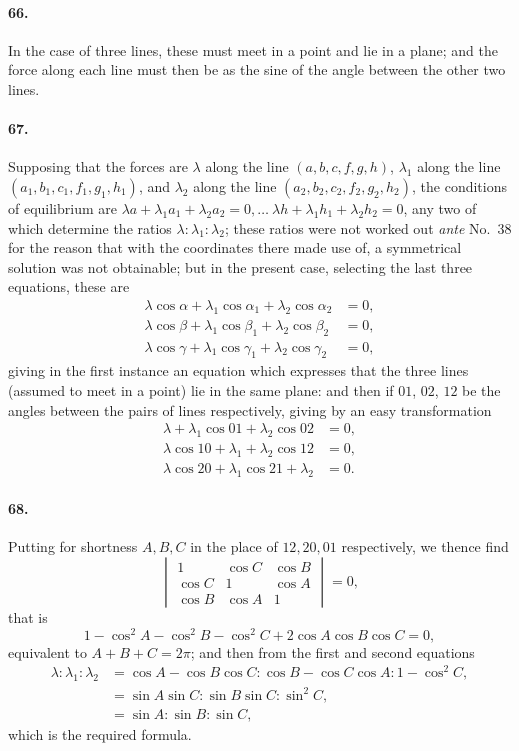 \documentclass[11pt,a4paper]{article}
\begin{document}
\paragraph{66.}
In the case of three lines, these must meet in a point and lie in a plane;
and the force along each line must then be as the sine of the angle between the
other two lines.

\paragraph{67.}
Supposing that the forces are $\lambda$ along the line $(a,b,c,f,g,h)$, $\lambda_1$
along the line $(a_1, b_1, c_1, f_1, g_1, h_1)$, and $\lambda_2$ along the line
$(a_2, b_2, c_2, f_2, g_2, h_2)$, the conditions of equilibrium are
$\lambda a + \lambda_1 a_1 + \lambda_2 a_2 = 0, \ldots\ \lambda h + \lambda_1 h_1 + \lambda_2 h_2 = 0$, any two of
which determine the ratios $\lambda : \lambda_1 : \lambda_2$; these ratios were not worked out
\textit{ante} No.\ 38 for the reason that with the coordinates there made use of, a
symmetrical solution was not obtainable; but in the present case, selecting the last
three equations, these are
\begin{align*}
\lambda \cos\alpha + \lambda_1 \cos\alpha_1 + \lambda_2 \cos\alpha_2 &= 0, \\
\lambda \cos\beta + \lambda_1 \cos\beta_1 + \lambda_2 \cos\beta_2 &= 0, \\
\lambda \cos\gamma + \lambda_1 \cos\gamma_1 + \lambda_2 \cos\gamma_2 &= 0,
\end{align*}
giving in the first instance an equation which expresses that the three lines (assumed
to meet in a point) lie in the same plane: and then if $01$, $02$, $12$ be the angles
between the pairs of lines respectively, giving by an easy transformation
\begin{align*}
\lambda + \lambda_1 \cos 01 + \lambda_2 \cos 02 &= 0, \\
\lambda \cos 10 + \lambda_1 + \lambda_2 \cos 12 &= 0, \\
\lambda \cos 20 + \lambda_1 \cos 21 + \lambda_2 &= 0.
\end{align*}

\paragraph{68.}
Putting for shortness $A, B, C$ in the place of $12, 20, 01$ respectively, we
thence find
\[
\begin{vmatrix}
1 & \cos C & \cos B \\
\cos C & 1 & \cos A \\
\cos B & \cos A & 1
\end{vmatrix} = 0,
\]
that is
\[
1 - \cos^2 A - \cos^2 B - \cos^2 C + 2 \cos A \cos B \cos C = 0,
\]
equivalent to $A + B + C = 2\pi$; and then from the first and second equations
\begin{align*}
\lambda : \lambda_1 : \lambda_2 &= \cos A - \cos B \cos C
 : \cos B - \cos C \cos A : 1 - \cos^2 C, \\
&= \sin A \sin C : \sin B \sin C : \sin^2 C, \\
&= \sin A : \sin B : \sin C,
\end{align*}
which is the required formula.
\end{document}
